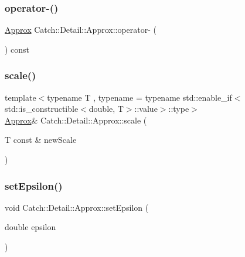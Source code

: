 \mbox{\label{class_catch_1_1_detail_1_1_approx_aa9adf5f05e641df770039543d5067d30}} 
\subsubsection{\texorpdfstring{operator-\/()}{operator-()}}
{\footnotesize\ttfamily \mbox{\hyperlink{class_catch_1_1_detail_1_1_approx}{Approx}} Catch\+::\+Detail\+::\+Approx\+::operator-\/ (\begin{DoxyParamCaption}{ }\end{DoxyParamCaption}) const}

\mbox{\label{class_catch_1_1_detail_1_1_approx_a8f4d2def2920a3840d3271f6d9c5ede2}} 
\subsubsection{\texorpdfstring{scale()}{scale()}}
{\footnotesize\ttfamily template$<$typename T , typename  = typename std\+::enable\+\_\+if$<$std\+::is\+\_\+constructible$<$double, T$>$\+::value$>$\+::type$>$ \\
\mbox{\hyperlink{class_catch_1_1_detail_1_1_approx}{Approx}}\& Catch\+::\+Detail\+::\+Approx\+::scale (\begin{DoxyParamCaption}\item[{T const \&}]{new\+Scale }\end{DoxyParamCaption})\hspace{0.3cm}{\ttfamily [inline]}}

\mbox{\label{class_catch_1_1_detail_1_1_approx_a28fd65e069b698bc7ae8f060bfbcd6b6}} 
\subsubsection{\texorpdfstring{setEpsilon()}{setEpsilon()}}
{\footnotesize\ttfamily void Catch\+::\+Detail\+::\+Approx\+::set\+Epsilon (\begin{DoxyParamCaption}\item[{double}]{epsilon }\end{DoxyParamCaption})\hspace{0.3cm}{\ttfamily [private]}}

